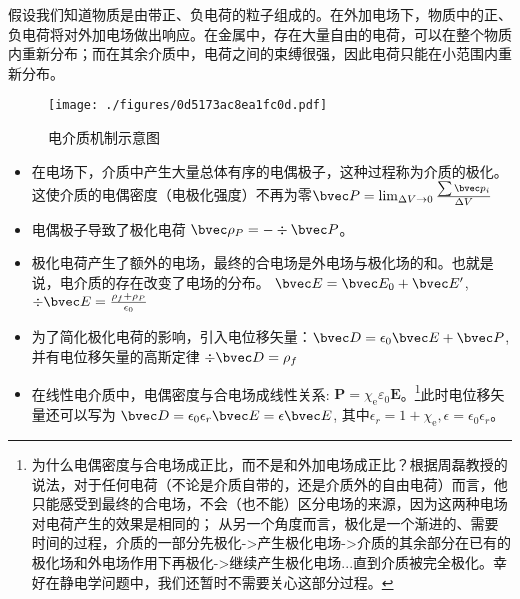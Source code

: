 
假设我们知道物质是由带正、负电荷的粒子组成的。在外加电场下，物质中的正、负电荷将对外加电场做出响应。在金属中，存在大量自由的电荷，可以在整个物质内重新分布；而在其余介质中，电荷之间的束缚很强，因此电荷只能在小范围内重新分布。

\begin{figure}[ht]
\centering
\texttt{[image: ./figures/0d5173ac8ea1fc0d.pdf]}
\caption{电介质机制示意图} \label{fig_DLT_1}
\end{figure}
\begin{itemize}
\item 在电场下，介质中产生大量总体有序的电偶极子，这种过程称为介质的极化。这使介质的电偶密度（电极化强度）不再为零$\bvec P = \lim_{\Delta V \to 0} \frac{\sum \bvec p_i}{\Delta V}$ 
\item 电偶极子导致了极化电荷 $\bvec \rho_P = - \div \bvec P$。
\item 极化电荷产生了额外的电场，最终的合电场是外电场与极化场的和。也就是说，电介质的存在改变了电场的分布。 $\bvec E = \bvec E_0 + \bvec E'$, $\div \bvec E = \frac{\rho_f+\rho_P}{\epsilon_0}$
\item 为了简化极化电荷的影响，引入电位移矢量：$\bvec D = \epsilon_0 \bvec E + \bvec P$,并有电位移矢量的高斯定律 $\div \bvec D = \rho_f$ 
\item 在线性电介质中，电偶密度与合电场成线性关系: $\mathbf P=\chi_{\mathrm e} \varepsilon_{0} \mathbf E$。\footnote{为什么电偶密度与合电场成正比，而不是和外加电场成正比？根据周磊教授的说法，对于任何电荷（不论是介质自带的，还是介质外的自由电荷）而言，他只能感受到最终的合电场，不会（也不能）区分电场的来源，因为这两种电场对电荷产生的效果是相同的；
从另一个角度而言，极化是一个渐进的、需要时间的过程，介质的一部分先极化->产生极化电场->介质的其余部分在已有的极化场和外电场作用下再极化->继续产生极化电场...直到介质被完全极化。幸好在静电学问题中，我们还暂时不需要关心这部分过程。}此时电位移矢量还可以写为 $\bvec D = \epsilon_0 \epsilon_r \bvec E = \epsilon \bvec E $, 其中$\epsilon_r = 1+\chi_{\mathrm e}, \epsilon = \epsilon_0 \epsilon_r$。
\end{itemize}
